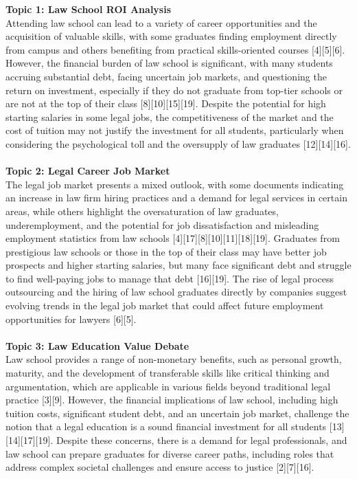 \begin{summary}[title={\modelTopic Summary: Is going to law school a good idea? (DebateQFS)}, label=summary4]

\textbf{Topic 1: Law School ROI Analysis}\\
Attending law school can lead to a variety of career opportunities and the acquisition of valuable skills, with some graduates finding employment directly from campus and others benefiting from practical skills-oriented courses [4][5][6]. However, the financial burden of law school is significant, with many students accruing substantial debt, facing uncertain job markets, and questioning the return on investment, especially if they do not graduate from top-tier schools or are not at the top of their class [8][10][15][19]. Despite the potential for high starting salaries in some legal jobs, the competitiveness of the market and the cost of tuition may not justify the investment for all students, particularly when considering the psychological toll and the oversupply of law graduates [12][14][16].\\
\\
\textbf{Topic 2: Legal Career Job Market}\\
The legal job market presents a mixed outlook, with some documents indicating an increase in law firm hiring practices and a demand for legal services in certain areas, while others highlight the oversaturation of law graduates, underemployment, and the potential for job dissatisfaction and misleading employment statistics from law schools [4][17][8][10][11][18][19]. Graduates from prestigious law schools or those in the top of their class may have better job prospects and higher starting salaries, but many face significant debt and struggle to find well-paying jobs to manage that debt [16][19]. The rise of legal process outsourcing and the hiring of law school graduates directly by companies suggest evolving trends in the legal job market that could affect future employment opportunities for lawyers [6][5].\\
\\
\textbf{Topic 3: Law Education Value Debate}\\
Law school provides a range of non-monetary benefits, such as personal growth, maturity, and the development of transferable skills like critical thinking and argumentation, which are applicable in various fields beyond traditional legal practice [3][9]. However, the financial implications of law school, including high tuition costs, significant student debt, and an uncertain job market, challenge the notion that a legal education is a sound financial investment for all students [13][14][17][19]. Despite these concerns, there is a demand for legal professionals, and law school can prepare graduates for diverse career paths, including roles that address complex societal challenges and ensure access to justice [2][7][16].
\end{summary}